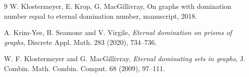 \documentclass[12pt]{article}
\begin{document}
\begin{thebibliography}{9}
W. Klostermeyer, E. Krop, G. MacGillivray, On graphs with domination number equal to
eternal domination number, manuscript, 2018.

A. Krim-Yee, B. Seamone and V. Virgile, \textit{Eternal domination on prisms
of graphs}, Discrete Appl. Math. 283 (2020), 734--736.

W. F. Klostermeyer and G. MacGillivray, \textit{Eternal dominating sets in
graphs}, J. Combin. Math. Combin. Comput. 68 (2009), 97--111.



\end{thebibliography}
\end{document}
